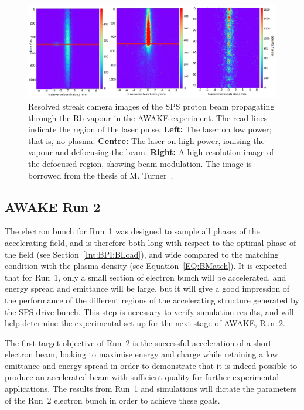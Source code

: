 \begin{figure}[hbt]
    \centering
    \includegraphics[width=0.90\linewidth,trim={0mm 0mm 0mm 0mm},clip]{figures/SMI-Turner}
    \caption{\label{Fig:SMI:Results}
        Resolved streak camera images of the SPS proton beam propagating through the Rb vapour in the AWAKE experiment.
        The read lines indicate the region of the laser pulse.
        \textbf{Left:} The laser on low power; that is, no plasma.
        \textbf{Centre:} The laser on high power, ionising the vapour and defocusing the beam.
        \textbf{Right:} A high resolution image of the defocused region, showing beam modulation.
        The image is borrowed from the thesis of M. Turner~\cite{turner:2017}.
    }
\end{figure}

\subsection{AWAKE Run 2}
\label{WFA:AWAKE:R2}

The electron bunch for Run~1 was designed to sample all phases of the accelerating field, and is therefore both long with respect to the optimal phase of the field (see Section~\ref{Int:BPI:BLoad}), and wide compared to the matching condition with the plasma density (see Equation~\ref{EQ:BMatch}).
It is expected that for Run~1, only a small section of electron bunch will be accelerated, and energy spread and emittance will be large, but it will give a good impression of the performance of the different regions of the accelerating structure generated by the SPS drive bunch.
This step is necessary to verify simulation results, and will help determine the experimental set-up for the next stage of AWAKE, Run~2.

The first target objective of Run~2 is the successful acceleration of a short electron beam, looking to maximise energy and charge while retaining a low emittance and energy spread in order to demonstrate that it is indeed possible to produce an accelerated beam with sufficient quality for further experimental applications.
The results from Run~1 and simulations will dictate the parameters of the Run~2 electron bunch in order to achieve these goals.

